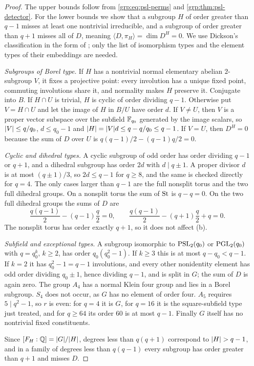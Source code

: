\begin{proof}
The upper bounds follow from \eqref{grp:eq:psl-perms} and
\cref{grp:thm:psl-detector}. For the lower bounds we show that a subgroup $H$
of order greater than $q-1$ misses at least one nontrivial irreducible, and a
subgroup of order greater than $q+1$ misses all of $D$, meaning
$\langle D,\pi_H\rangle=\dim D^H=0$. We use Dickson's classification in the
form of \cite[Theorem~A.1]{GuralnickZieve2010Polynomials}; only the list of
isomorphism types and the element types of their embeddings are needed.

\emph{Subgroups of Borel type.} If $H$ has a nontrivial normal elementary
abelian $2$-subgroup $V$, it fixes a projective point: every involution has a
unique fixed point, commuting involutions share it, and normality makes $H$
preserve it. Conjugate into $B$. If $H\cap U$ is trivial, $H$ is cyclic of
order dividing $q-1$. Otherwise put $V=H\cap U$ and let the image of $H$ in
$B/U$ have order $d$. If $V\ne U$, then $V$ is a proper vector subspace over
the subfield $\mathbb{F}_{q_0}$ generated by the image scalars, so $\lvert V\rvert\le q/q_0$,
$d\le q_0-1$ and $\lvert H\rvert=\lvert V\rvert d\le q-q/q_0\le q-1$. If $V=U$, then $D^H=0$
because the sum of $D$ over $U$ is $q(q-1)/2-(q-1)q/2=0$.

\emph{Cyclic and dihedral types.} A cyclic subgroup of odd order has order
dividing $q-1$ or $q+1$, and a dihedral subgroup has order $2d$ with
$d\mid q\pm1$. A proper divisor $d$ is at most $(q\pm1)/3$, so $2d\le q-1$ for
$q\ge8$, and the same is checked directly for $q=4$. The only cases larger
than $q-1$ are the full nonsplit torus and the two full dihedral groups. On a
nonsplit torus the sum of $\mathrm{St}$ is $q-q=0$. On the two full dihedral groups
the sums of $D$ are
\[
 \frac{q(q-1)}2-(q-1)\frac q2=0,\qquad
 \frac{q(q-1)}2-(q+1)\frac q2+q=0 .
\]
The nonsplit torus has order exactly $q+1$, so it does not affect (b).

\emph{Subfield and exceptional types.} A subgroup isomorphic to
$\operatorname{PSL}_2(q_0)$ or $\operatorname{PGL}_2(q_0)$ with $q=q_0^k$, $k\ge2$, has order
$q_0(q_0^2-1)$. If $k\ge3$ this is at most $q-q_0<q-1$. If $k=2$ it has
$q_0^2-1=q-1$ involutions, and every other nonidentity element has odd order
dividing $q_0\pm1$, hence dividing $q-1$, and is split in $G$; the sum of $D$
is again zero. The group $A_4$ has a normal Klein four group and lies in a
Borel subgroup. $S_4$ does not occur, as $G$ has no element of order four.
$A_5$ requires $5\mid q^2-1$, so $r$ is even: for $q=4$ it is $G$, for $q=16$
it is the square-subfield type just treated, and for $q\ge64$ its order $60$
is at most $q-1$. Finally $G$ itself has no nontrivial fixed constituents.

Since $[F_H:\mathbb{Q}]=\lvert G\rvert/\lvert H\rvert$, degrees less than $q(q+1)$ correspond to
$\lvert H\rvert>q-1$, and in a family of degrees less than $q(q-1)$ every subgroup has
order greater than $q+1$ and misses $D$.
\end{proof}

